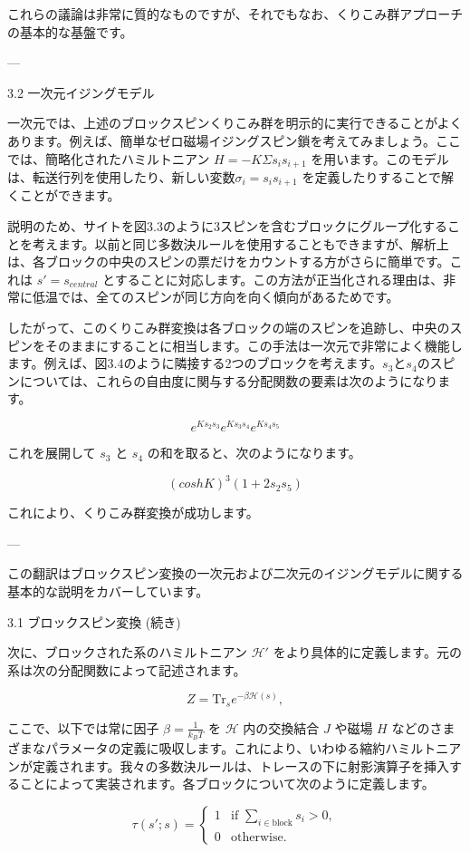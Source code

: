 \documentclass[a4paper,10pt]{ltjsarticle} %
\begin{document}
これらの議論は非常に質的なものですが、それでもなお、くりこみ群アプローチの基本的な基盤です。

---

3.2 一次元イジングモデル

一次元では、上述のブロックスピンくりこみ群を明示的に実行できることがよくあります。例えば、簡単なゼロ磁場イジングスピン鎖を考えてみましょう。ここでは、簡略化されたハミルトニアン $H = -K Σ s_i s_{i+1}$ を用います。このモデルは、転送行列を使用したり、新しい変数$σ_i = s_i s_{i+1}$ を定義したりすることで解くことができます。

説明のため、サイトを図3.3のように3スピンを含むブロックにグループ化することを考えます。以前と同じ多数決ルールを使用することもできますが、解析上は、各ブロックの中央のスピンの票だけをカウントする方がさらに簡単です。これは $s' = s_{central}$ とすることに対応します。この方法が正当化される理由は、非常に低温では、全てのスピンが同じ方向を向く傾向があるためです。

したがって、このくりこみ群変換は各ブロックの端のスピンを追跡し、中央のスピンをそのままにすることに相当します。この手法は一次元で非常によく機能します。例えば、図3.4のように隣接する2つのブロックを考えます。$s_3とs_4$のスピンについては、これらの自由度に関与する分配関数の要素は次のようになります。

\[ e^{K s_2 s_3} e^{K s_3 s_4} e^{K s_4 s_5} \]

これを展開して $s_3$ と $s_4$ の和を取ると、次のようになります。

\[ (cosh K)^3 (1 + 2s_2 s_5) \]

これにより、くりこみ群変換が成功します。


---

この翻訳はブロックスピン変換の一次元および二次元のイジングモデルに関する基本的な説明をカバーしています。

 3.1 ブロックスピン変換 (続き)

次に、ブロックされた系のハミルトニアン \( \mathcal{H}' \) をより具体的に定義します。元の系は次の分配関数によって記述されます。

\[ Z = \text{Tr}_s e^{-\beta \mathcal{H}(s)}, \tag{3.1} \]

ここで、以下では常に因子 \( \beta = \frac{1}{k_B T} \) を \( \mathcal{H} \) 内の交換結合 \( J \) や磁場 \( H \) などのさまざまなパラメータの定義に吸収します。これにより、いわゆる縮約ハミルトニアンが定義されます。我々の多数決ルールは、トレースの下に射影演算子を挿入することによって実装されます。各ブロックについて次のように定義します。

\[ \tau(s'; s) = \begin{cases}
1 & \text{if } \sum_{i \in \text{block}} s_i > 0, \\
0 & \text{otherwise}.
\end{cases} \tag{3.2} \]
\end{document}
